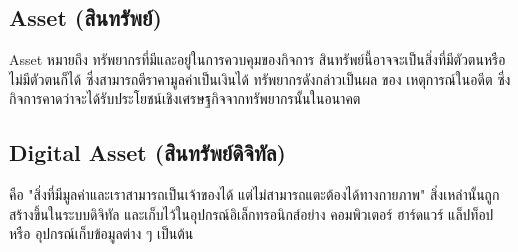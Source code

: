 \documentclass[12pt,oneside,openright,a4paper]{cpe-thai-project}
\begin{document}
\subsection{Asset (สินทรัพย์)}
\tab Asset หมายถึง ทรัพยากรที่มีและอยู่ในการควบคุมของกิจการ สินทรัพย์นี้อาจจะเป็นสิ่งที่มีตัวตนหรือไม่มีตัวตนก็ได้ ซึ่งสามารถตีราคามูลค่าเป็นเงินได้ ทรัพยากรดังกล่าวเป็นผล ของ เหตุการณ์ในอดีต ซึ่งกิจการคาดว่าจะได้รับประโยชน์เชิงเศรษฐกิจจากทรัพยากรนั้นในอนาคต

\subsection{Digital Asset (สินทรัพย์ดิจิทัล)}
\tab คือ "สิ่งที่มีมูลค่าและเราสามารถเป็นเจ้าของได้ แต่ไม่สามารถแตะต้องได้ทางกายภาพ" สิ่งเหล่านั้นถูกสร้างขึ้นในระบบดิจิทัล และเก็บไว้ในอุปกรณ์อิเล็กทรอนิกส์อย่าง คอมพิวเตอร์ ฮาร์ดแวร์ แล็ปท็อป หรือ อุปกรณ์เก็บข้อมูลต่าง ๆ เป็นต้น
\end{document}
